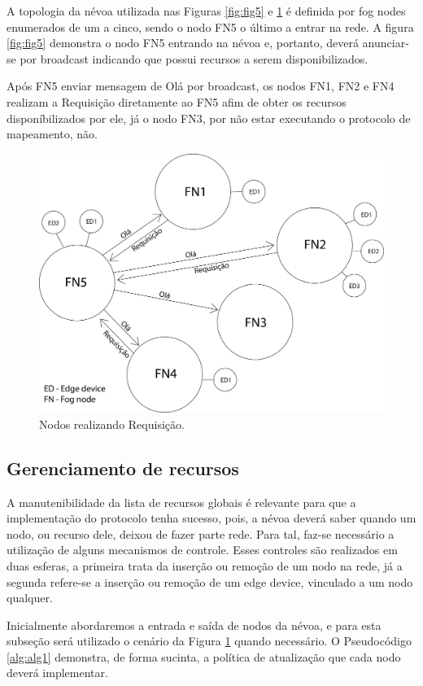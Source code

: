 A topologia da névoa utilizada nas Figuras \ref{fig:fig5} e \ref{fig:fig6} é definida por fog nodes enumerados de um a cinco, sendo o nodo FN5 o último a entrar na rede.
A figura \ref{fig:fig5} demonstra o nodo FN5 entrando na névoa e, portanto, deverá anunciar-se por broadcast indicando que possui recursos a serem disponibilizados.

Após FN5 enviar mensagem de Olá por broadcast, os nodos FN1, FN2 e FN4 realizam a Requisição diretamente ao FN5 afim de obter os recursos disponíbilizados por ele,
já o nodo FN3, por não estar executando o protocolo de mapeamento, não.

\begin{figure}[htb!]
    \centering\includegraphics[width=.5\textwidth]{fig6.png}
    \caption%
    {\label{fig:fig6} Nodos realizando Requisição.}
\end{figure}


\subsection{Gerenciamento de recursos}

A manutenibilidade da lista de recursos globais é relevante para que a implementação do protocolo tenha sucesso, pois, a névoa deverá saber quando um nodo, ou recurso dele, deixou de fazer parte rede.
Para tal, faz-se necessário a utilização de alguns mecanismos de controle.
Esses controles são realizados em duas esferas, a primeira trata da inserção ou remoção de um nodo na rede,
já a segunda refere-se a inserção ou remoção de um edge device, vinculado a um nodo qualquer.



Inicialmente abordaremos a entrada e saída de nodos da névoa, e para esta subseção será utilizado o cenário da Figura \ref{fig:fig6} quando necessário.
O Pseudocódigo \ref{alg:alg1} demonstra, de forma sucinta, a política de atualização que cada nodo deverá implementar.

